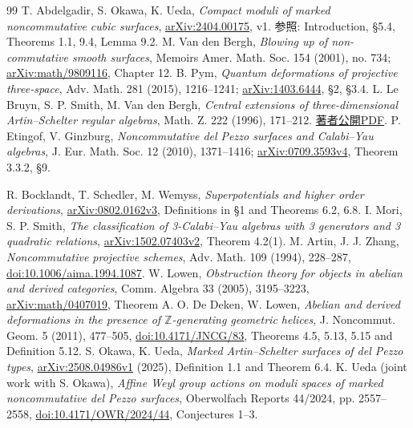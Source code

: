 \documentclass[11pt,a4paper]{ltjsarticle}
\theoremstyle{definition}\newtheorem{remark}[theorem]{注意}
\begin{document}
\begin{thebibliography}{99}
 T. Abdelgadir, S. Okawa, K. Ueda,
\emph{Compact moduli of marked noncommutative cubic surfaces},
\href{https://arxiv.org/abs/2404.00175}{arXiv:2404.00175}, v1.
参照: Introduction, \S5.4, Theorems 1.1, 9.4, Lemma 9.2.
 M. Van den Bergh,
\emph{Blowing up of non-commutative smooth surfaces},
Memoirs Amer. Math. Soc. 154 (2001), no. 734;
\href{https://arxiv.org/abs/math/9809116}{arXiv:math/9809116}, Chapter 12.
 B. Pym, \emph{Quantum deformations of projective three-space},
Adv. Math. 281 (2015), 1216--1241;
\href{https://arxiv.org/abs/1403.6444}{arXiv:1403.6444}, \S2, \S3.4.
 L. Le Bruyn, S. P. Smith, M. Van den Bergh,
\emph{Central extensions of three-dimensional Artin--Schelter regular algebras},
Math. Z. 222 (1996), 171--212.
\href{https://sites.math.washington.edu/~smith/Research/Central-extns.pdf}{著者公開PDF}.
 P. Etingof, V. Ginzburg,
\emph{Noncommutative del Pezzo surfaces and Calabi--Yau algebras},
J. Eur. Math. Soc. 12 (2010), 1371--1416;
\href{https://arxiv.org/abs/0709.3593}{arXiv:0709.3593v4}, Theorem 3.3.2, \S9.

 R. Bocklandt, T. Schedler, M. Wemyss,
\emph{Superpotentials and higher order derivations},
\href{https://arxiv.org/abs/0802.0162}{arXiv:0802.0162v3}, Definitions in \S1 and Theorems 6.2, 6.8.
 I. Mori, S. P. Smith,
\emph{The classification of 3-Calabi--Yau algebras with 3 generators and 3 quadratic relations},
\href{https://arxiv.org/abs/1502.07403}{arXiv:1502.07403v2}, Theorem 4.2(1).
 M. Artin, J. J. Zhang,
\emph{Noncommutative projective schemes}, Adv. Math. 109 (1994), 228--287,
\href{https://doi.org/10.1006/aima.1994.1087}{doi:10.1006/aima.1994.1087}.
 W. Lowen,
\emph{Obstruction theory for objects in abelian and derived categories},
Comm. Algebra 33 (2005), 3195--3223,
\href{https://arxiv.org/abs/math/0407019}{arXiv:math/0407019}, Theorem A.
 O. De Deken, W. Lowen,
\emph{Abelian and derived deformations in the presence of $\mathbb Z$-generating geometric helices},
J. Noncommut. Geom. 5 (2011), 477--505,
\href{https://doi.org/10.4171/JNCG/83}{doi:10.4171/JNCG/83},
Theorems 4.5, 5.13, 5.15 and Definition 5.12.
 S. Okawa, K. Ueda,
\emph{Marked Artin--Schelter surfaces of del Pezzo types},
\href{https://arxiv.org/abs/2508.04986}{arXiv:2508.04986v1} (2025),
Definition 1.1 and Theorem 6.4.
 K. Ueda (joint work with S. Okawa),
\emph{Affine Weyl group actions on moduli spaces of marked noncommutative del Pezzo surfaces},
Oberwolfach Reports 44/2024, pp. 2557--2558,
\href{https://doi.org/10.4171/OWR/2024/44}{doi:10.4171/OWR/2024/44}, Conjectures 1--3.

\end{thebibliography}
\end{document}
